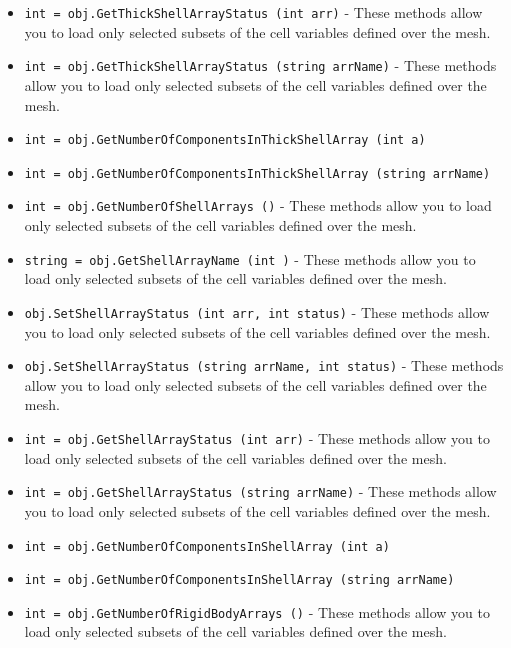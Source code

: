 \begin{itemize}
\item  \verb|int = obj.GetThickShellArrayStatus (int arr)| -  These methods allow you to load only selected subsets of the cell
 variables defined over the mesh.

\item  \verb|int = obj.GetThickShellArrayStatus (string arrName)| -  These methods allow you to load only selected subsets of the cell
 variables defined over the mesh.

\item  \verb|int = obj.GetNumberOfComponentsInThickShellArray (int a)|

\item  \verb|int = obj.GetNumberOfComponentsInThickShellArray (string arrName)|

\item  \verb|int = obj.GetNumberOfShellArrays ()| -  These methods allow you to load only selected subsets of the cell
 variables defined over the mesh.

\item  \verb|string = obj.GetShellArrayName (int )| -  These methods allow you to load only selected subsets of the cell
 variables defined over the mesh.

\item  \verb|obj.SetShellArrayStatus (int arr, int status)| -  These methods allow you to load only selected subsets of the cell
 variables defined over the mesh.

\item  \verb|obj.SetShellArrayStatus (string arrName, int status)| -  These methods allow you to load only selected subsets of the cell
 variables defined over the mesh.

\item  \verb|int = obj.GetShellArrayStatus (int arr)| -  These methods allow you to load only selected subsets of the cell
 variables defined over the mesh.

\item  \verb|int = obj.GetShellArrayStatus (string arrName)| -  These methods allow you to load only selected subsets of the cell
 variables defined over the mesh.

\item  \verb|int = obj.GetNumberOfComponentsInShellArray (int a)|

\item  \verb|int = obj.GetNumberOfComponentsInShellArray (string arrName)|

\item  \verb|int = obj.GetNumberOfRigidBodyArrays ()| -  These methods allow you to load only selected subsets of the cell
 variables defined over the mesh.


\end{itemize}
